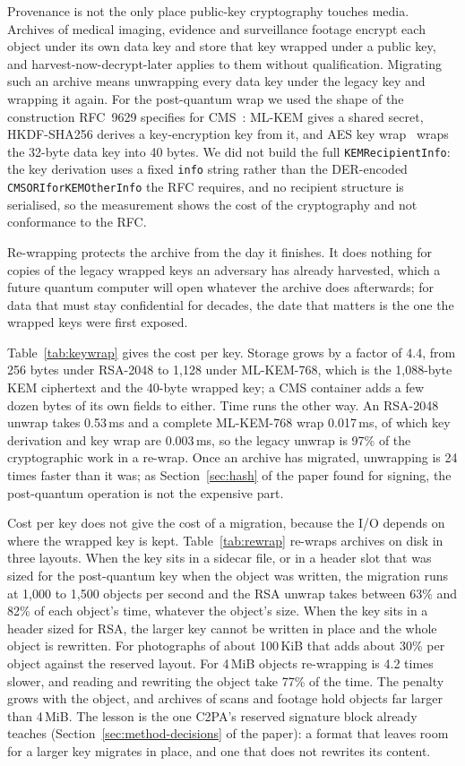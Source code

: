 
Provenance is not the only place public-key cryptography touches media.
Archives of medical imaging, evidence and surveillance footage encrypt each
object under its own data key and store that key wrapped under a public key,
and harvest-now-decrypt-later applies to them without qualification. Migrating
such an archive means unwrapping every data key under the legacy key and
wrapping it again. For the post-quantum wrap we used the shape of the
construction RFC~9629 specifies for CMS~\cite{rfc9629}: ML-KEM gives a shared
secret, HKDF-SHA256 derives a key-encryption key from it, and AES key
wrap~\cite{rfc3394} wraps the 32-byte data key into 40 bytes. We did not build
the full \texttt{KEMRecipientInfo}: the key derivation uses a fixed
\texttt{info} string rather than the DER-encoded
\texttt{CMSORIforKEMOtherInfo} the RFC requires, and no recipient structure is
serialised, so the measurement shows the cost of the cryptography and not
conformance to the RFC.

Re-wrapping protects the archive from the day it finishes. It does nothing
for copies of the legacy wrapped keys an adversary has already harvested,
which a future quantum computer will open whatever the archive does
afterwards; for data that must stay confidential for decades, the date that
matters is the one the wrapped keys were first exposed.

Table~\ref{tab:keywrap} gives the cost per key. Storage grows by a factor of
4.4, from 256 bytes under RSA-2048 to 1,128 under ML-KEM-768, which is the
1,088-byte KEM ciphertext and the 40-byte wrapped key; a CMS container adds a
few dozen bytes of its own fields to either. Time runs the
other way. An RSA-2048 unwrap takes 0.53\,ms and a complete ML-KEM-768 wrap
0.017\,ms, of which key derivation and key wrap are 0.003\,ms, so the legacy
unwrap is 97\% of the cryptographic work in a re-wrap. Once an archive has
migrated, unwrapping is 24 times faster than it was; as Section~\ref{sec:hash} of the paper found for signing, the post-quantum operation is not the expensive part.


Cost per key does not give the cost of a migration, because the I/O depends on
where the wrapped key is kept. Table~\ref{tab:rewrap} re-wraps archives on
disk in three layouts. When the key sits in a sidecar file, or in a header
slot that was sized for the post-quantum key when the object was written, the
migration runs at 1,000 to 1,500 objects per second and the RSA unwrap takes
between 63\% and 82\% of each object's time, whatever the object's size. When
the key sits in a header sized for RSA, the larger key cannot be written in
place and the whole object is rewritten. For photographs of about 100\,KiB
that adds about 30\% per object against the reserved layout. For 4\,MiB
objects re-wrapping is 4.2 times slower, and reading and rewriting the object
take 77\% of the time. The penalty grows with the object, and archives of
scans and footage hold objects far larger than 4\,MiB. The lesson is the one
C2PA's reserved signature block already teaches
(Section~\ref{sec:method-decisions} of the paper): a format that leaves room for a larger
key migrates in place, and one that does not rewrites its content.



